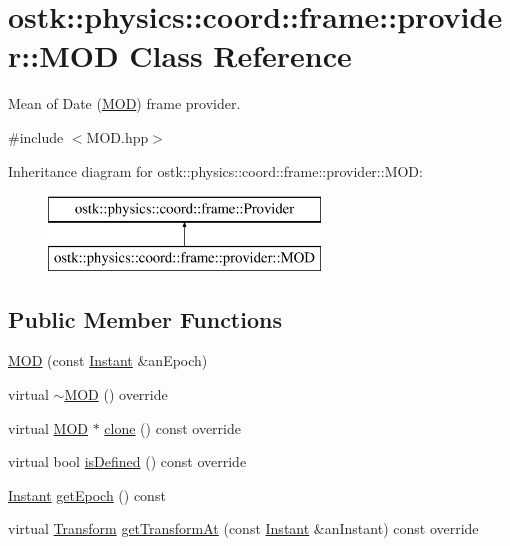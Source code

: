 \hypertarget{classostk_1_1physics_1_1coord_1_1frame_1_1provider_1_1_m_o_d}{}\section{ostk\+:\+:physics\+:\+:coord\+:\+:frame\+:\+:provider\+:\+:M\+OD Class Reference}
\label{classostk_1_1physics_1_1coord_1_1frame_1_1provider_1_1_m_o_d}


Mean of Date (\hyperlink{classostk_1_1physics_1_1coord_1_1frame_1_1provider_1_1_m_o_d}{M\+OD}) frame provider.  




{\ttfamily \#include $<$M\+O\+D.\+hpp$>$}

Inheritance diagram for ostk\+:\+:physics\+:\+:coord\+:\+:frame\+:\+:provider\+:\+:M\+OD\+:\begin{figure}[H]
\begin{center}
\leavevmode
\includegraphics[height=2.000000cm]{classostk_1_1physics_1_1coord_1_1frame_1_1provider_1_1_m_o_d}
\end{center}
\end{figure}
\subsection*{Public Member Functions}
\begin{DoxyCompactItemize}
\item 
\hyperlink{classostk_1_1physics_1_1coord_1_1frame_1_1provider_1_1_m_o_d_acba77d3f427fdbbb5753e86acf5edbc7}{M\+OD} (const \hyperlink{classostk_1_1physics_1_1time_1_1_instant}{Instant} \&an\+Epoch)
\item 
virtual \hyperlink{classostk_1_1physics_1_1coord_1_1frame_1_1provider_1_1_m_o_d_adedfb79ae3a617c0cfb963bec8d0ecc8}{$\sim$\+M\+OD} () override
\item 
virtual \hyperlink{classostk_1_1physics_1_1coord_1_1frame_1_1provider_1_1_m_o_d}{M\+OD} $\ast$ \hyperlink{classostk_1_1physics_1_1coord_1_1frame_1_1provider_1_1_m_o_d_ac7d8c3c340359b0bf13728aa93d285e4}{clone} () const override
\item 
virtual bool \hyperlink{classostk_1_1physics_1_1coord_1_1frame_1_1provider_1_1_m_o_d_a0b6a40a222857ad032f5d5a8d228ab16}{is\+Defined} () const override
\item 
\hyperlink{classostk_1_1physics_1_1time_1_1_instant}{Instant} \hyperlink{classostk_1_1physics_1_1coord_1_1frame_1_1provider_1_1_m_o_d_a6a78725c9f6621b5be08206fe7ed3242}{get\+Epoch} () const
\item 
virtual \hyperlink{classostk_1_1physics_1_1coord_1_1_transform}{Transform} \hyperlink{classostk_1_1physics_1_1coord_1_1frame_1_1provider_1_1_m_o_d_abe3960b9717d20f5e7945407c76ddb96}{get\+Transform\+At} (const \hyperlink{classostk_1_1physics_1_1time_1_1_instant}{Instant} \&an\+Instant) const override
\end{DoxyCompactItemize}



